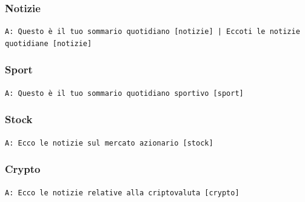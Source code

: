 \subsubsection{Notizie}
\texttt{A: Questo è il tuo sommario quotidiano [notizie] | Eccoti le notizie quotidiane [notizie]}

\subsubsection{Sport}
\texttt{A: Questo è il tuo sommario quotidiano sportivo [sport]}


\subsubsection{Stock}  
\texttt{A: Ecco le notizie sul mercato azionario [stock]}

\subsubsection{Crypto}  
\texttt{A: Ecco le notizie relative alla criptovaluta [crypto]}

